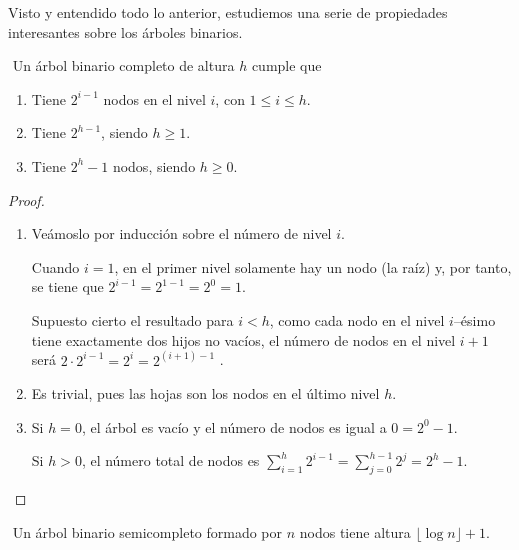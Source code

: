 Visto y entendido todo lo anterior, estudiemos una serie de propiedades interesantes sobre los árboles binarios.\newline
\begin{prop}$ $\newline
	Un árbol binario completo de altura $h$ cumple que
	\begin{enumerate}[]
		\item Tiene $2^{i - 1}$ nodos en el nivel $i$, con $1 \leq i \leq h$.
		\item Tiene $2^{h - 1}$, siendo $h \geq 1$. 
		\item Tiene $2^h - 1$ nodos, siendo $h \geq 0$.
	\end{enumerate}
\end{prop}

\begin{proof}$ $
	\begin{enumerate}[]
		\item Veámoslo por inducción sobre el número de nivel $i$.
		
		Cuando $i = 1$, en el primer nivel solamente hay un nodo (la raíz) y, por tanto, se tiene que $2^{i - 1} = 2^{1 - 1} = 2^0 = 1$.
		
		Supuesto cierto el resultado para $i < h$, como cada nodo en el nivel $i$--ésimo tiene exactamente dos hijos no vacíos, el número de nodos en el nivel $i + 1$ será $2\cdot 2^{i - 1} = 2^i = 2^{(i + 1)  - 1}$  .
		\item Es trivial, pues las hojas son los nodos en el último nivel $h$.
		\item Si $h = 0$, el árbol es vacío y el número de nodos es igual a $0 = 2^0 - 1$.
		
		Si $h > 0$, el número total de nodos es $\displaystyle\sum_{i = 1}^{h}2^{i - 1} = \displaystyle\sum_{j = 0}^{h - 1}2^j = 2^h - 1$.
	\end{enumerate}
\end{proof}

\begin{prop}$ $\newline
	Un árbol binario semicompleto formado por $n$ nodos tiene altura $\lfloor \log n \rfloor + 1$.
	
\end{prop}

